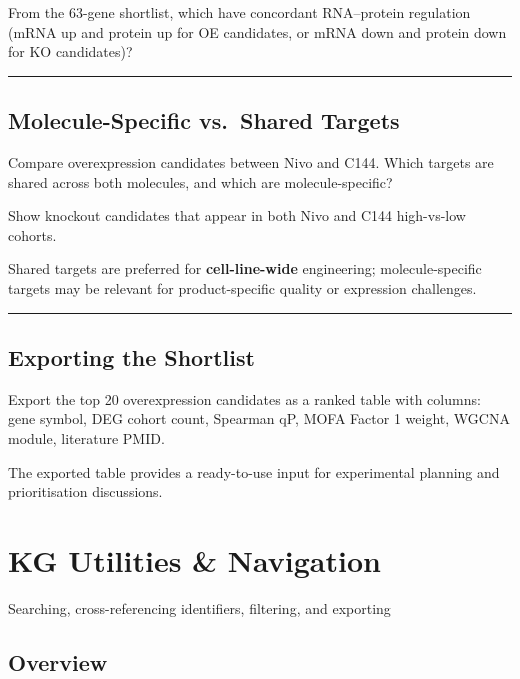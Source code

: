 \documentclass[
  letterpaper,
  oneside,
  open=any]{scrbook}
\begin{document}
From the 63-gene shortlist, which have concordant RNA--protein
regulation (mRNA up and protein up for OE candidates, or mRNA down and
protein down for KO candidates)?

\begin{center}\rule{0.5\linewidth}{0.5pt}\end{center}

\section{Molecule-Specific vs.~Shared
Targets}\label{molecule-specific-vs.-shared-targets}

Compare overexpression candidates between Nivo and C144. Which targets
are shared across both molecules, and which are molecule-specific?

Show knockout candidates that appear in both Nivo and C144 high-vs-low
cohorts.

Shared targets are preferred for \textbf{cell-line-wide} engineering;
molecule-specific targets may be relevant for product-specific quality
or expression challenges.

\begin{center}\rule{0.5\linewidth}{0.5pt}\end{center}

\section{Exporting the Shortlist}\label{exporting-the-shortlist}

Export the top 20 overexpression candidates as a ranked table with
columns: gene symbol, DEG cohort count, Spearman qP, MOFA Factor 1
weight, WGCNA module, literature PMID.

The exported table provides a ready-to-use input for experimental
planning and prioritisation discussions.


\chapter{KG Utilities \& Navigation}\label{kg-utilities-navigation}

Searching, cross-referencing identifiers, filtering, and exporting

\hfill\break

\section{Overview}\label{sec-utilities}
\end{document}
